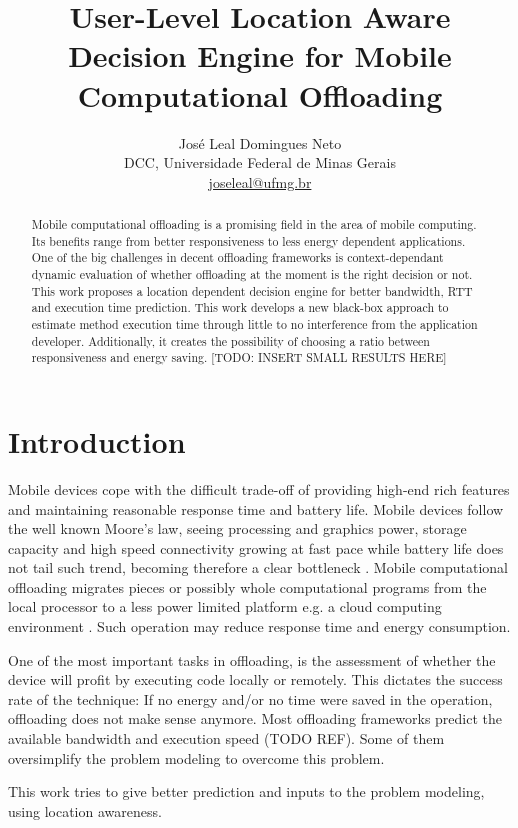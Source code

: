 \documentclass[10pt, conference, letterpaper]{IEEEtran}
\title{User-Level Location Aware Decision Engine for Mobile Computational Offloading}
\author{José Leal Domingues Neto \\ DCC, Universidade Federal de Minas Gerais \\ \href{mailto:joseleal@ufmg.br}{joseleal@ufmg.br}}
\begin{document}
\maketitle

\begin{abstract}
  Mobile computational offloading is a promising field in the area of mobile computing. Its benefits range from better responsiveness to less energy dependent applications. One of the big challenges in decent offloading frameworks is context-dependant dynamic evaluation of whether offloading at the moment is the right decision or not. This work proposes a location dependent decision engine for better bandwidth, RTT and execution time prediction. This work develops a new black-box approach to estimate method execution time through little to no interference from the application developer. Additionally, it creates the possibility of choosing a ratio between responsiveness and energy saving. [TODO: INSERT SMALL RESULTS HERE]
\end{abstract}

\section{Introduction}
  Mobile devices cope with the difficult trade-off of providing high-end rich features and maintaining reasonable response time and battery life. Mobile devices follow the well known Moore's law, seeing processing and graphics power, storage capacity and high speed connectivity growing at fast pace while battery life does not tail such trend, becoming therefore a clear bottleneck \cite{Cuervo:2010:MMS:1814433.1814441}. Mobile computational offloading migrates pieces or possibly whole computational programs from the local processor to a less power limited platform e.g. a cloud computing environment \cite{Scavenger:5466972}. Such operation may reduce response time and energy consumption.  

  One of the most important tasks in offloading, is the assessment of whether the device will profit by executing code locally or remotely. This dictates the success rate of the technique: If no energy and/or no time were saved in the operation, offloading does not make sense anymore. Most offloading frameworks predict the available bandwidth and execution speed (TODO REF). Some of them oversimplify the problem modeling to overcome this problem.
  
  This work tries to give better prediction and inputs to the problem modeling, using location awareness.
  
\end{document}
